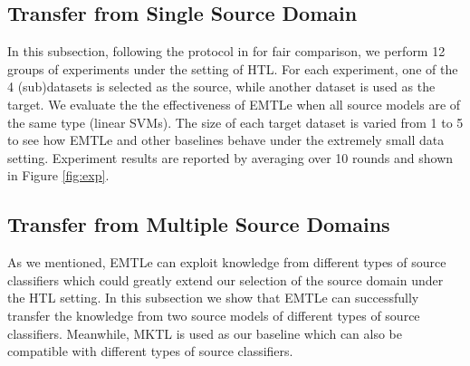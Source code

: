 \subsection{Transfer from Single Source Domain}
In this subsection, following the protocol in \cite{jie2011multiclass,tommasi2014learning} for fair comparison, we perform 12 groups of experiments under the setting of HTL. 
For each experiment, one of the 4 (sub)datasets is selected as the source, while another dataset is used as the target. We evaluate the the effectiveness of EMTLe when all source models are of the same type (linear SVMs).
The size of each target dataset is varied from 1 to 5 to see how EMTLe and other baselines behave under the extremely small data setting.
Experiment results are reported by averaging over 10 rounds and shown in Figure \ref{fig:exp}. 


\subsection{Transfer from Multiple Source Domains}
As we mentioned, EMTLe can exploit knowledge from different types of source classifiers which could greatly extend our selection of the source domain under the HTL setting. In this subsection we show that EMTLe can successfully transfer the knowledge from two source models of different types of source classifiers. Meanwhile, MKTL is used as our baseline which can also be compatible with different types of source classifiers. 

